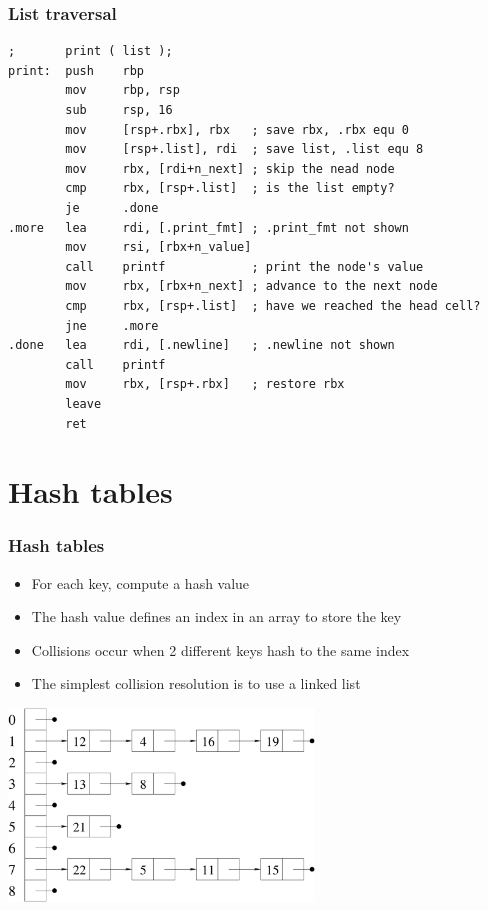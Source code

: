 \documentclass{beamer}
\begin{document}
\begin{frame}[fragile]
    \frametitle{List traversal}
\footnotesize
\begin{verbatim}
;       print ( list );
print:  push    rbp
        mov     rbp, rsp
        sub     rsp, 16
        mov     [rsp+.rbx], rbx   ; save rbx, .rbx equ 0
        mov     [rsp+.list], rdi  ; save list, .list equ 8
        mov     rbx, [rdi+n_next] ; skip the nead node
        cmp     rbx, [rsp+.list]  ; is the list empty?
        je      .done
.more   lea     rdi, [.print_fmt] ; .print_fmt not shown
        mov     rsi, [rbx+n_value]
        call    printf            ; print the node's value
        mov     rbx, [rbx+n_next] ; advance to the next node
        cmp     rbx, [rsp+.list]  ; have we reached the head cell?
        jne     .more
.done   lea     rdi, [.newline]   ; .newline not shown
        call    printf
        mov     rbx, [rsp+.rbx]   ; restore rbx
        leave
        ret
\end{verbatim}
\end{frame}

\section{Hash tables}

\begin{frame}
    \frametitle{Hash tables}
    \begin{itemize}
        \item For each key, compute a hash value
        \item The hash value defines an index in an array to store the key
        \item Collisions occur when 2 different keys hash to the same index
        \item The simplest collision resolution is to use a linked list
    \end{itemize}
\begin{center}
\centering\includegraphics[width=3.2in]{hash_table.pdf}
\end{center}
\end{frame}
\end{document}
